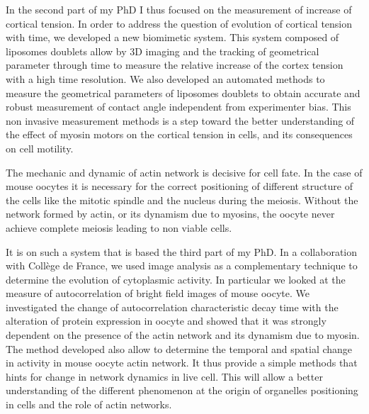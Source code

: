 \documentclass[A4paperpaper,11pt,english]{sphinxmanual}
\begin{document}
In the second part of my PhD I thus focused on the measurement of increase of
cortical tension. In order to address the question of evolution of cortical
tension with time, we developed a new biomimetic system. This system composed
of liposomes doublets allow by 3D imaging and the tracking of geometrical
parameter through time to measure the relative increase of the cortex tension
with a high time resolution. We also developed an automated methods to measure
the geometrical parameters of liposomes doublets to obtain accurate and robust
measurement of contact angle independent from experimenter bias.  This non
invasive measurement methods is a step toward the better understanding of the
effect of myosin motors on the cortical tension in cells, and its consequences
on cell motility.

The mechanic and dynamic of  actin network is decisive for cell fate. In the
case of mouse oocytes it is necessary for the correct positioning of different
structure of the cells like the mitotic spindle and the nucleus during the
meiosis. Without the network formed by actin, or its dynamism due to myosins,
the oocyte never achieve complete meiosis leading to non viable cells.

It is on such a system that is based the third part of my PhD. In a
collaboration with Collège de France, we used image analysis as a complementary
technique to determine the evolution of cytoplasmic activity. In particular we
looked at the measure of autocorrelation of bright field images of mouse
oocyte.  We investigated the change of autocorrelation characteristic decay
time with the alteration of protein expression in oocyte and showed that it was
strongly dependent on the presence of the actin network and its dynamism due to
myosin. The method developed also allow to determine the temporal and spatial
change in activity in mouse oocyte actin network. It thus provide a simple
methods that hints for change in network dynamics in live cell. This will allow
a better understanding of the different phenomenon at the origin of organelles
positioning in cells and the role of actin networks.
\end{document}
